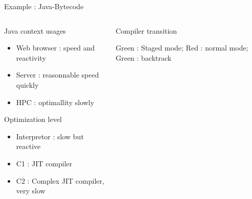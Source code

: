 %
\begin{Frame}{Example : Java-Bytecode}
  \begin{columns}[t]
    \begin{column}{\BW} %
      \begin{block}{Java context usages}
        \begin{itemize}
        \item Web browser : speed and reactivity
        \item Server : reasonnable speed quickly
        \item HPC : optimallity slowly
        \end{itemize}
      \end{block} 
      \begin{block}{Optimization level}
        \begin{itemize}
        \item Interpretor : slow but reactive
        \item C1 : JIT compiler
        \item C2 : Complex JIT compiler, very slow
        \end{itemize}
      \end{block} 
    \end{column}
    
    \begin{column}{\BW} %
      \begin{block}{Compiler transition}
      \end{block}
      Green : Staged mode; Red : normal mode; Green : backtrack
    \end{column}
  \end{columns}  
\end{Frame}


